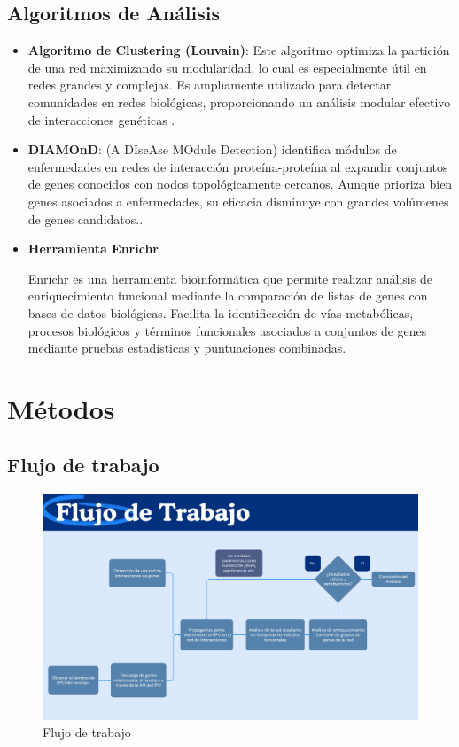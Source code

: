\subsection{Algoritmos de Análisis}


\begin{itemize}
	\item \textbf{Algoritmo de Clustering (Louvain)}: Este algoritmo optimiza la partición de una red maximizando su modularidad, lo cual es especialmente útil en redes grandes y complejas. Es ampliamente utilizado para detectar comunidades en redes biológicas, proporcionando un análisis modular efectivo de interacciones genéticas \cite{Blondel2008}.
	
	\item \textbf{DIAMOnD}: (A DIseAse MOdule Detection) identifica módulos de enfermedades en redes de interacción proteína-proteína al expandir conjuntos de genes conocidos con nodos topológicamente cercanos. Aunque prioriza bien genes asociados a enfermedades, su eficacia disminuye con grandes volúmenes de genes candidatos.\cite{Ghiassian2015}.
	
	

	\item \textbf{Herramienta Enrichr}
	
	Enrichr es una herramienta bioinformática que permite realizar análisis de enriquecimiento funcional mediante la comparación de listas de genes con bases de datos biológicas. Facilita la identificación de vías metabólicas, procesos biológicos y términos funcionales asociados a conjuntos de genes mediante pruebas estadísticas y puntuaciones combinadas.\cite{10.1093/nar/gkad393}
	
	
\end{itemize}



\section{Métodos}

\subsection{Flujo de trabajo}

\begin{figure}[h!]
	\includegraphics[width=.95\textwidth]{figures/workflow.png}
	\caption{Flujo de trabajo}
	\label{fig:workflow}
\end{figure}

